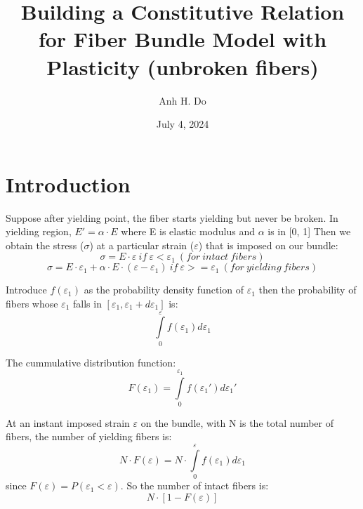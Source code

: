 \documentclass{article}
\begin{document}
\title{Building a Constitutive Relation for Fiber Bundle Model with Plasticity (unbroken fibers)}
\author{Anh H. Do}
\date{July 4, 2024}

\maketitle


\section{Introduction}

Suppose after yielding point, the fiber starts yielding but never be broken. In yielding region, $E' = \alpha \cdot E$ 
where E is elastic modulus and $\alpha$ is in [0, 1]
Then we obtain the stress ($\sigma$) at a particular strain ($\varepsilon$) that is imposed on our bundle:
\begin{equation}
\sigma = E \cdot \varepsilon       
~if~ \varepsilon < \varepsilon_1 ~(for ~intact ~fibers)
\end{equation}
\begin{equation}
\sigma = E \cdot \varepsilon_1 + \alpha \cdot E \cdot (\varepsilon - \varepsilon_1)      
~if~ \varepsilon >= \varepsilon_1 ~(for ~yielding ~fibers)
\end{equation}

Introduce $f(\varepsilon_1)$ as the probability density function of $\varepsilon_1$ then the probability of fibers whose $\varepsilon_1$ falls in $[\varepsilon_1, \varepsilon_1 + d\varepsilon_1]$ is: 
\begin{equation}
\int\limits_0^\varepsilon f(\varepsilon_1)d\varepsilon_1
\end{equation}

The cummulative distribution function:
\begin{equation}
F(\varepsilon_1) = \int\limits_0^{\varepsilon_1} f(\varepsilon_1')d\varepsilon_1'
\end{equation}
 
At an instant imposed strain $\varepsilon$ on the bundle, with N is the total number of fibers, the number of yielding fibers is:
\begin{equation}
    N \cdot F(\varepsilon) = N \cdot \int\limits_0^\varepsilon f(\varepsilon_1)d\varepsilon_1
\end{equation}
since $F(\varepsilon) = P(\varepsilon_1 < \varepsilon)$. So the number of intact fibers is: 
\begin{equation}
    N \cdot [1 - F(\varepsilon)]
\end{equation}
\end{document}
